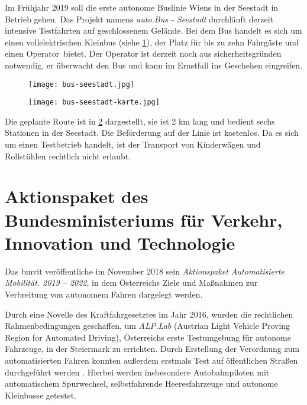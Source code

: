 Im Frühjahr 2019 soll die erste autonome Buslinie Wiens in der Seestadt in Betrieb gehen. Das Projekt namens \emph{auto.Bus - Seestadt} durchläuft derzeit intensive Testfahrten auf geschlossenem Gelände. Bei dem Bus handelt es sich um einen vollelektrischen Kleinbus (siehe \ref{bus-seestadt}), der Platz für bis zu zehn Fahrgäste und einen Operator~bietet. Der Operator ist derzeit noch aus sicherheitsgründen notwendig, er überwacht den Bus und kann im Ernstfall ins Geschehen eingreifen. 

\begin{figure}\centering
  \texttt{[image: bus-seestadt.jpg]}
  \label{bus-seestadt}
\end{figure}

\begin{figure}\centering
  \texttt{[image: bus-seestadt-karte.jpg]}
  \label{bus-seestadt-karte}
\end{figure}

Die geplante Route ist in \ref{bus-seestadt-karte} dargestellt, sie ist 2 \si{\kilo\metre} lang und bedient sechs Stationen in der Seestadt. Die Beförderung auf der Linie ist kostenlos. Da es sich um einen Testbetrieb handelt, ist der Transport von Kinderwägen und Rollstühlen rechtlich nicht erlaubt.

\FloatBarrier
\section{Aktionspaket des Bundesministeriums für Verkehr, Innovation und Technologie}

Das \ac{bmvit} veröffentliche im November 2018 sein \emph{Aktionspaket Automatisierte Mobilität. 2019 -- 2022}, in dem Österreichs Ziele und Maßnahmen zur Verbreitung von autonomem Fahren dargelegt werden.

Durch eine Novelle des Kraftfahrgesetztes im Jahr 2016, wurden die rechtlichen Rahmenbedingungen geschaffen, um \emph{ALP.Lab} (Austrian Light Vehicle Proving Region for Automated Driving), Österreichs erste Testumgebung für autonome Fahrzeuge, in der Steiermark zu errichten. Durch Erstellung der Verordnung zum automatisierten Fahren konnten außerdem erstmals Test auf öffentlichen Straßen durchgeführt werden . Hierbei werden insbesondere Autobahnpiloten mit automatischem Spurwechsel, selbstfahrende Heeresfahrzeuge und autonome Kleinbusse getestet.

